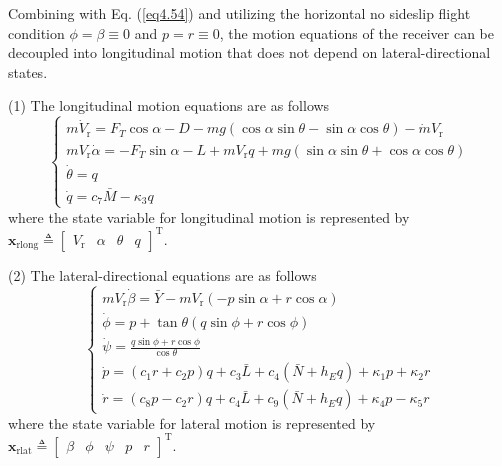 Combining with Eq. (\ref{eq4.54}) and utilizing the horizontal no sideslip flight condition $\phi  = \beta  \equiv 0$ and $p = r \equiv 0$, the motion equations of the receiver can be decoupled into longitudinal motion that does not depend on lateral-directional states.

(1) The longitudinal motion equations are as follows
\begin{equation}\label{eq4.56}
\left\{ \begin{array}{l}
m{{\dot V}_\text{r}} = {F_T}\cos \alpha  - D - mg\left( {\cos \alpha \sin \theta  - \sin \alpha \cos \theta } \right) - \dot m{V_\text{r}}\\
m{V_\text{r}}\dot \alpha  =  - {F_T}\sin \alpha  - L + m{V_\text{r}}q + mg\left( {\sin \alpha \sin \theta  + \cos \alpha \cos \theta } \right)\\
\dot \theta  = q\\
\dot q = {c_7}\bar M - {\kappa _3}q
\end{array} \right.
\end{equation}
where the state variable for longitudinal motion is represented by ${\mathbf{x}_{\mathrm{rlong}}} \triangleq {\left[ {\begin{array}{*{20}{c}}
		{{V_\mathrm{r}}}&\alpha &\theta &q
		\end{array}} \right]^\mathrm{T}}$.

(2) The lateral-directional equations are as follows
\begin{equation}\label{eq4.57}
\left\{ \begin{array}{l}
m{V_\mathrm{r}}\dot \beta  = \bar Y - m{V_\mathrm{r}}\left( { - p\sin \alpha  + r\cos \alpha } \right)\\
\dot \phi  = p + \tan \theta \left( {q\sin \phi  + r\cos \phi } \right)\\
\dot \psi  = \frac{{q\sin \phi  + r\cos \phi }}{{\cos \theta }}\\
\dot p = \left( {{c_1}r + {c_2}p} \right)q + {c_3}\bar L + {c_4}\left( {\bar N + {h_E}q} \right) + {\kappa _1}p + {\kappa _2}r\\
\dot r = \left( {{c_8}p - {c_2}r} \right)q + {c_4}\bar L + {c_9}\left( {\bar N + {h_E}q} \right) + {\kappa _4}p - {\kappa _5}r
\end{array} \right.
\end{equation}
where the state variable for lateral motion is represented by ${\mathbf{x}_{\mathrm{rlat}}} \triangleq {\left[ {\begin{array}{*{20}{c}}
		\beta &\phi &\psi &p&r
		\end{array}} \right]^\mathrm{T}}$.

